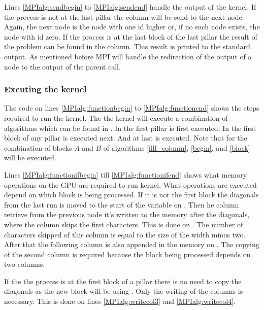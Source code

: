 Lines \ref{MPIalg:sendbegin} to \ref{MPIalg:sendend} handle the output of the kernel.
If the process is not at the last pillar the column will be send to the next node.
Again, the next node is the node with one id higher or, if no such node exists, the node with id zero.
If the process is at the last block of the last pillar the result of the problem can be found in the column.
This result is printed to the standard output.
As mentioned before MPI will handle the redirection of the output of a node to the output of the parent call.

\subsubsection{Excuting the kernel}
The code on lines \ref{MPIalg:functionbegin} to \ref{MPIalg:functionend} shows the steps required to run the kernel.
The the kernel will execute a combination of algorithms which can be found in .
In the first pillar  is first executed.
In the first block of any pillar  is executed next.
And at last  is executed.
Note that for the combination of blocks $A$ and $B$ of  algorithms \ref{fill_column}, \ref{begin}, and \ref{block} will be executed.

Lines \ref{MPIalg:functionifbegin} till \ref{MPIalg:functionifend} shows what memory operations on the GPU are required to run kernel.
What operations are executed depend on which block is being processed.
If it is not the first block the diagonals from the last run is moved to the start of the variable on .
Then he column retrieve from the previous node it's written to the memory after the diagonals, where the column skips the first characters.
This is done on .
The number of characters skipped of this column is equal to the size of the width minus two.
After that the following column is also appended in the memory on .
The copying of the second column is required because the block being processed depends on two columns.

If the the process is at the first block of a pillar there is no need to copy the diagonals as the new block will be using .
Only the writing of the columns is necessary.
This is done on lines \ref{MPIalg:writecol3} and \ref{MPIalg:writecol4}.


